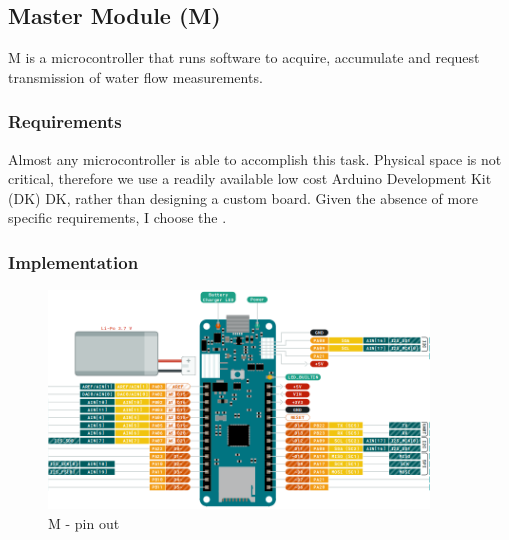 \subsection{\mu Master Module (\mu M)}

\mu M is a microcontroller that runs software to acquire, accumulate and request transmission of water flow measurements.

\subsubsection{Requirements}
Almost any microcontroller is able to accomplish this task.
Physical space is not critical, therefore we use a readily available low cost  Arduino Development Kit (DK)
DK, rather than designing a custom board. Given the absence of more specific requirements,
I choose the \cite{noauthor_arduino_2016-1} .

\subsubsection{Implementation}



\clearpage
\begin{figure}[h]
    \centering
    \includegraphics[width=0.9\textwidth]{MA/uM/uM}
    \caption{\mu M - pin out \cite{noauthor_arduino_2016-1}}
\end{figure}

\clearpage


